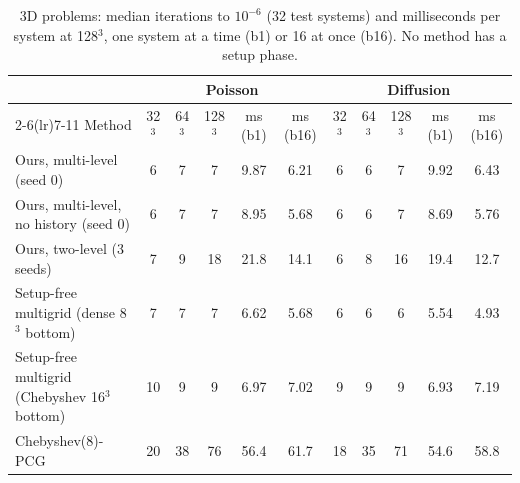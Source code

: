 \begin{table}[t]
\centering
\footnotesize
\caption{3D problems: median iterations to $10^{-6}$ (32 test systems) and milliseconds per system at 128$^3$, one system at a time (b1) or 16 at once (b16). No method has a setup phase.}
\label{tab:three_d}
\begin{tabular}{lcccccccccc}
\toprule
& \multicolumn{5}{c}{Poisson} & \multicolumn{5}{c}{Diffusion} \\
\cmidrule(lr){2-6}\cmidrule(lr){7-11}
Method & 32$^3$ & 64$^3$ & 128$^3$ & ms (b1) & ms (b16) & 32$^3$ & 64$^3$ & 128$^3$ & ms (b1) & ms (b16) \\
\midrule
Ours, multi-level (seed 0) & 6 & 7 & 7 & 9.87 & 6.21 & 6 & 6 & 7 & 9.92 & 6.43 \\
Ours, multi-level, no history (seed 0) & 6 & 7 & 7 & 8.95 & 5.68 & 6 & 6 & 7 & 8.69 & 5.76 \\
Ours, two-level (3 seeds) & 7 & 9 & 18 & 21.8 & 14.1 & 6 & 8 & 16 & 19.4 & 12.7 \\
Setup-free multigrid (dense 8$^3$ bottom) & 7 & 7 & 7 & 6.62 & 5.68 & 6 & 6 & 6 & 5.54 & 4.93 \\
Setup-free multigrid (Chebyshev 16$^3$ bottom) & 10 & 9 & 9 & 6.97 & 7.02 & 9 & 9 & 9 & 6.93 & 7.19 \\
Chebyshev(8)-PCG & 20 & 38 & 76 & 56.4 & 61.7 & 18 & 35 & 71 & 54.6 & 58.8 \\
\bottomrule
\end{tabular}
\end{table}
